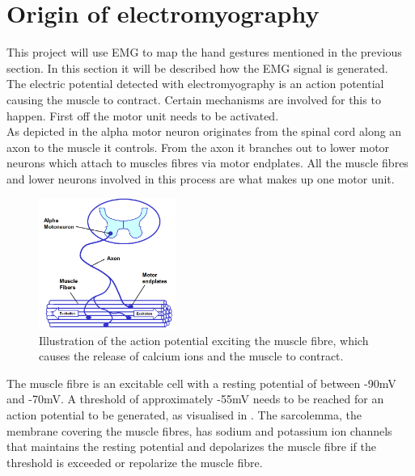 \section{Origin of electromyography} \label{sec:physiology}
This project will use EMG to map the hand gestures mentioned in the previous section. In this section it will be described how the EMG signal is generated. \\
The electric potential detected with electromyography is an action potential causing the muscle to contract. Certain mechanisms are involved for this to happen. First off the motor unit needs to be activated. \\
As depicted in  the alpha motor neuron originates from the spinal cord along an axon to the muscle it controls. From the axon it branches out to lower motor neurons which attach to muscles fibres via motor endplates. All the muscle fibres and lower neurons involved in this process are what makes up one motor unit.

\begin{figure}[H]
	\includegraphics[width=0.4\textwidth]{figures/Anatomy/EMG_generation}  %
	\caption{Illustration of the action potential exciting the muscle fibre, which causes the release of calcium ions and the muscle to contract. \cite{konrad2005}}
	\label{fig:EMG_generation}  %
\end{figure}


The muscle fibre is an excitable cell with a resting potential of between -90mV and -70mV. A threshold of approximately -55mV needs to be reached for an action potential to be generated, as visualised in . The sarcolemma, the membrane covering the muscle fibres, has sodium and potassium ion channels that maintains the resting potential and depolarizes the muscle fibre if the threshold is exceeded or repolarize the muscle fibre. \cite{cram2012}


